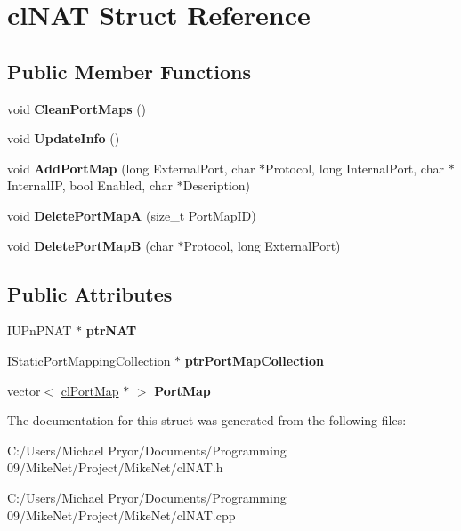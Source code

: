 \hypertarget{structcl_n_a_t}{
\section{clNAT Struct Reference}
\label{structcl_n_a_t}
}
\subsection*{Public Member Functions}
\begin{DoxyCompactItemize}
\item 
\hypertarget{structcl_n_a_t_a447731f4475902a42b6705e4cd1cbf96}{
void {\bfseries CleanPortMaps} ()}
\label{structcl_n_a_t_a447731f4475902a42b6705e4cd1cbf96}

\item 
\hypertarget{structcl_n_a_t_a62f0f3bac282d8e0497926637ee65644}{
void {\bfseries UpdateInfo} ()}
\label{structcl_n_a_t_a62f0f3bac282d8e0497926637ee65644}

\item 
\hypertarget{structcl_n_a_t_a28a181554f6108bf41321e9769221bce}{
void {\bfseries AddPortMap} (long ExternalPort, char $\ast$Protocol, long InternalPort, char $\ast$InternalIP, bool Enabled, char $\ast$Description)}
\label{structcl_n_a_t_a28a181554f6108bf41321e9769221bce}

\item 
\hypertarget{structcl_n_a_t_afca18bee71340759a2dd106ec0f16410}{
void {\bfseries DeletePortMapA} (size\_\-t PortMapID)}
\label{structcl_n_a_t_afca18bee71340759a2dd106ec0f16410}

\item 
\hypertarget{structcl_n_a_t_a79149341f1bb28a1a3a6e400e8549571}{
void {\bfseries DeletePortMapB} (char $\ast$Protocol, long ExternalPort)}
\label{structcl_n_a_t_a79149341f1bb28a1a3a6e400e8549571}

\end{DoxyCompactItemize}
\subsection*{Public Attributes}
\begin{DoxyCompactItemize}
\item 
\hypertarget{structcl_n_a_t_a35c8a16deaecf9efedc80cdc89fc9f97}{
IUPnPNAT $\ast$ {\bfseries ptrNAT}}
\label{structcl_n_a_t_a35c8a16deaecf9efedc80cdc89fc9f97}

\item 
\hypertarget{structcl_n_a_t_a560aa45c294592d4536817fec6231e2c}{
IStaticPortMappingCollection $\ast$ {\bfseries ptrPortMapCollection}}
\label{structcl_n_a_t_a560aa45c294592d4536817fec6231e2c}

\item 
\hypertarget{structcl_n_a_t_a85d1ecee3085aee2dd67553665de42c1}{
vector$<$ \hyperlink{structcl_port_map}{clPortMap} $\ast$ $>$ {\bfseries PortMap}}
\label{structcl_n_a_t_a85d1ecee3085aee2dd67553665de42c1}

\end{DoxyCompactItemize}


The documentation for this struct was generated from the following files:\begin{DoxyCompactItemize}
\item 
C:/Users/Michael Pryor/Documents/Programming 09/MikeNet/Project/MikeNet/clNAT.h\item 
C:/Users/Michael Pryor/Documents/Programming 09/MikeNet/Project/MikeNet/clNAT.cpp\end{DoxyCompactItemize}
